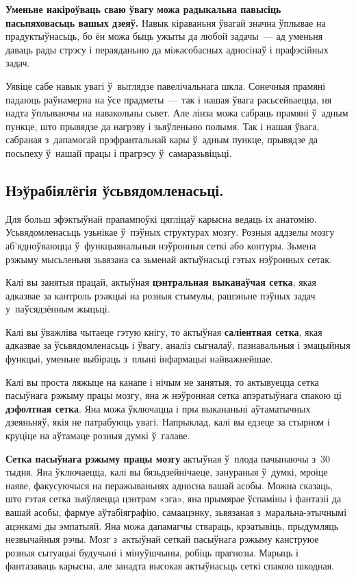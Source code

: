 \textbf{Уменьне накіроўваць сваю ўвагу можа радыкальна павысіць пасьпяховасьць вашых дзеяў.} Навык кіраваньня ўвагай значна ўплывае на прадуктыўнасьць, бо ён можа быць ужыты да любой задачы~--- ад уменьня даваць рады стрэсу і пераяданьню да міжасобасных адносінаў і прафэсійных задач.

Уявіце сабе навык увагі ў~выглядзе павелічальнага шкла. Сонечныя прамяні падаюць раўнамерна на ўсе прадметы~--- так і нашая ўвага расьсейваецца, ня надта ўплываючы на навакольны сьвет. Але лінза можа сабраць прамяні ў~адным пункце, што прывядзе да нагрэву і зьяўленьню полымя. Так і нашая ўвага, сабраная з~дапамогай прэфрантальнай кары ў~адным пункце, прывядзе да посьпеху ў~нашай працы і прагрэсу ў~самаразьвіцьці.

\subsection*{Нэўрабіялёгія ўсьвядомленасьці.}

Для больш эфэктыўнай прапампоўкі цягліцаў карысна ведаць іх анатомію. Усьвядомленасьць узьнікае ў~пэўных структурах мозгу. Розныя аддзелы мозгу аб'ядноўваюцца ў~функцыянальныя нэўронныя сеткі або контуры. Зьмена рэжыму мысьленьня зьвязана са зьменай актыўнасьці гэтых нэўронных сетак.

Калі вы занятыя працай, актыўная \textbf{цэнтральная выканаўчая сетка}, якая адказвае за кантроль рэакцыі на розныя стымулы, рашэньне пэўных задач у~паўсядзённым жыцьці.

Калі вы ўважліва чытаеце гэтую кнігу, то актыўная \textbf{саліентная сетка}, якая адказвае за ўсьвядомленасьць і ўвагу, аналіз сыгналаў, пазнавальныя і эмацыйныя функцыі, уменьне выбіраць з~плыні інфармацыі найважнейшае.

Калі вы проста ляжыце на канапе і нічым не занятыя, то актывуецца сетка пасыўнага рэжыму працы мозгу, яна ж нэўронная сетка апэратыўнага спакою ці \textbf{дэфолтная сетка}. Яна можа ўключацца і пры выкананьні аўтаматычных дзеяньняў, якія не патрабуюць увагі. Напрыклад, калі вы едзеце за стырном і круціце на аўтамаце розныя думкі ў~галаве.

\textbf{Сетка пасыўнага рэжыму працы мозгу} актыўная ў~плода пачынаючы з~30 тыдня. Яна ўключаецца, калі вы бязьдзейнічаеце, занураныя ў~думкі, мроіце наяве, факусуючыся на перажываньнях адносна вашай асобы. Можна сказаць, што гэтая сетка зьяўляецца цэнтрам «эга», яна прымярае ўспаміны і фантазіі да вашай асобы, фармуе аўтабіяграфію, самаацэнку, зьвязаная з~маральна-этычнымі ацэнкамі ды эмпатыяй. Яна можа дапамагчы ствараць, крэатывіць, прыдумляць незвычайныя рэчы. Мозг з~актыўнай сеткай пасыўнага рэжыму канструюе розныя сытуацыі будучыні і мінуўшчыны, робіць прагнозы. Марыць і фантазаваць карысна, але занадта высокая актыўнасьць сеткі спакою шкодная.

